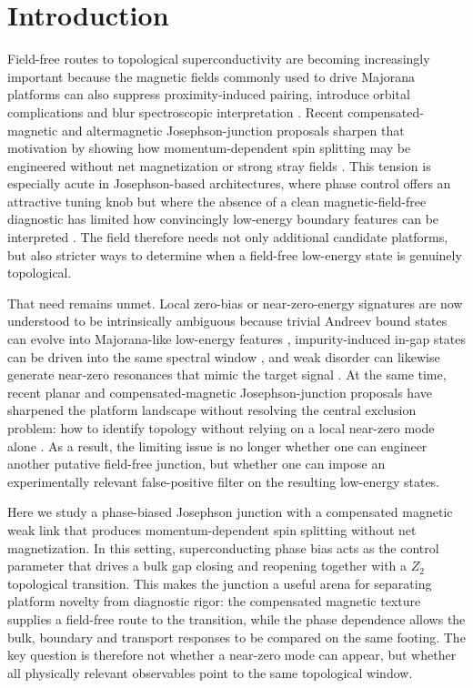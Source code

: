 \documentclass[11pt]{article}
\begin{document}
\section{Introduction}

Field-free routes to topological superconductivity are becoming increasingly important because the magnetic fields commonly used to drive Majorana platforms can also suppress proximity-induced pairing, introduce orbital complications and blur spectroscopic interpretation \cite{majorana-platform-review}. Recent compensated-magnetic and altermagnetic Josephson-junction proposals sharpen that motivation by showing how momentum-dependent spin splitting may be engineered without net magnetization or strong stray fields \cite{fieldfree-tsc-review}. This tension is especially acute in Josephson-based architectures, where phase control offers an attractive tuning knob but where the absence of a clean magnetic-field-free diagnostic has limited how convincingly low-energy boundary features can be interpreted \cite{phase-biased-jj-majorana-review}. The field therefore needs not only additional candidate platforms, but also stricter ways to determine when a field-free low-energy state is genuinely topological.

That need remains unmet. Local zero-bias or near-zero-energy signatures are now understood to be intrinsically ambiguous because trivial Andreev bound states can evolve into Majorana-like low-energy features \cite{local-zbp-ambiguity-review}, impurity-induced in-gap states can be driven into the same spectral window \cite{abs-false-positive-review}, and weak disorder can likewise generate near-zero resonances that mimic the target signal \cite{disorder-false-positive-review}. At the same time, recent planar and compensated-magnetic Josephson-junction proposals have sharpened the platform landscape without resolving the central exclusion problem: how to identify topology without relying on a local near-zero mode alone \cite{planar-jj-topological-sc,compensated-magnetic-jj-tajj-2026}. As a result, the limiting issue is no longer whether one can engineer another putative field-free junction, but whether one can impose an experimentally relevant false-positive filter on the resulting low-energy states.

Here we study a phase-biased Josephson junction with a compensated magnetic weak link that produces momentum-dependent spin splitting without net magnetization. In this setting, superconducting phase bias acts as the control parameter that drives a bulk gap closing and reopening together with a $Z_2$ topological transition. This makes the junction a useful arena for separating platform novelty from diagnostic rigor: the compensated magnetic texture supplies a field-free route to the transition, while the phase dependence allows the bulk, boundary and transport responses to be compared on the same footing. The key question is therefore not whether a near-zero mode can appear, but whether all physically relevant observables point to the same topological window.
\end{document}
